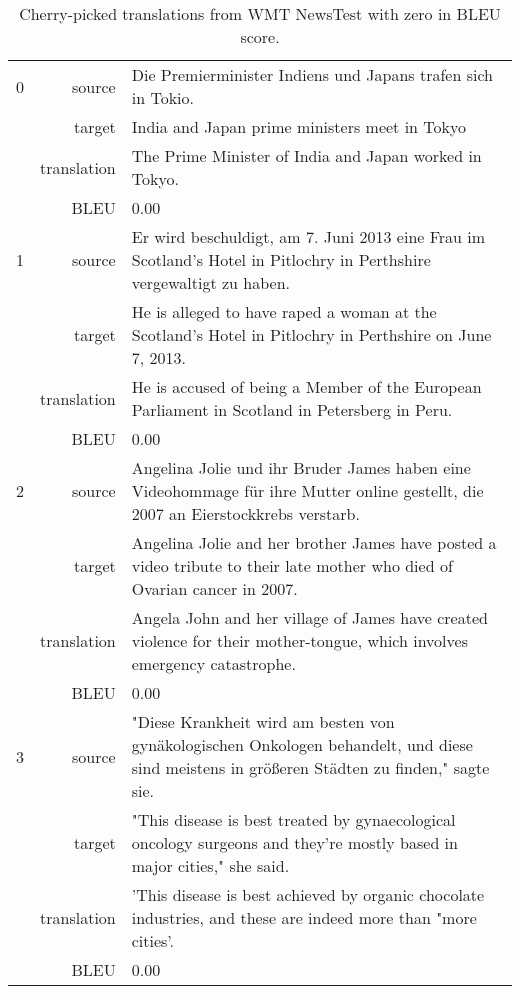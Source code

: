 \begin{table}[h]
\centering
\begin{tabular}{l|r|p{10cm}}
0 & source & Die Premierminister Indiens und Japans trafen sich in Tokio. \\[0.1cm]
& target & India and Japan prime ministers meet in Tokyo \\[0.1cm]
& translation & The Prime Minister of India and Japan worked in Tokyo. \\[0.1cm]
& BLEU & 0.00 \\[0.1cm] \hline

1 & source & Er wird beschuldigt, am 7. Juni 2013 eine Frau im Scotland's Hotel in Pitlochry in Perthshire vergewaltigt zu haben. \\[0.1cm]
& target & He is alleged to have raped a woman at the Scotland's Hotel in Pitlochry in Perthshire on June 7, 2013. \\[0.1cm]
& translation & He is accused of being a Member of the European Parliament in Scotland in Petersberg in Peru. \\[0.1cm]
& BLEU & 0.00 \\[0.1cm] \hline

2 & source & Angelina Jolie und ihr Bruder James haben eine Videohommage für ihre Mutter online gestellt, die 2007 an Eierstockkrebs verstarb. \\[0.1cm]
& target & Angelina Jolie and her brother James have posted a video tribute to their late mother who died of Ovarian cancer in 2007. \\[0.1cm]
& translation & Angela John and her village of James have created violence for their mother-tongue, which involves emergency catastrophe. \\[0.1cm]
& BLEU & 0.00 \\[0.1cm] \hline

3 & source & "Diese Krankheit wird am besten von gynäkologischen Onkologen behandelt, und diese sind meistens in größeren Städten zu finden," sagte sie. \\[0.1cm]
& target & "This disease is best treated by gynaecological oncology surgeons and they're mostly based in major cities," she said. \\[0.1cm]
& translation & 'This disease is best achieved by organic chocolate industries, and these are indeed more than "more cities'. \\[0.1cm]
& BLEU & 0.00
\end{tabular}
\caption{Cherry-picked translations from WMT NewsTest with zero in BLEU score.}
\label{table:result:bytenet:zero-belu}
\end{table}

